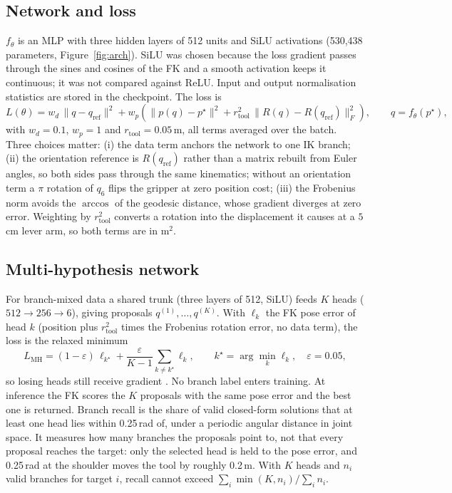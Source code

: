 \documentclass[11pt]{article}
\begin{document}
\subsection{Network and loss}
$f_\theta$ is an MLP with three hidden layers of 512 units and SiLU activations
\citep{elfwing2018silu} (530,438 parameters, Figure~\ref{fig:arch}). SiLU was
chosen because the loss gradient passes through the sines and cosines of the
FK and a smooth activation keeps it continuous; it was not compared against
ReLU. Input and output normalisation statistics are stored in the checkpoint.
The loss is
\begin{equation}
L(\theta) = w_d\,\|q-q_{\mathrm{ref}}\|^2
 + w_p\left(\|p(q)-p^\star\|^2 + r_{\mathrm{tool}}^2\,\|R(q)-R(q_{\mathrm{ref}})\|_F^2\right),
\qquad q=f_\theta(p^\star),
\label{eq:loss}
\end{equation}
with $w_d=0.1$, $w_p=1$ and $r_{\mathrm{tool}}=0.05$\,m, all terms averaged
over the batch. Three choices matter:
(i) the data term anchors the network to one IK branch;
(ii) the orientation reference is $R(q_{\mathrm{ref}})$ rather than a matrix
rebuilt from Euler angles, so both sides pass through the same kinematics;
without an orientation term a $\pi$ rotation of $q_6$ flips the gripper at zero
position cost;
(iii) the Frobenius norm avoids the $\arccos$ of the geodesic distance, whose
gradient diverges at zero error. Weighting by $r_{\mathrm{tool}}^2$ converts a
rotation into the displacement it causes at a $5$\,cm lever arm, so both terms
are in m$^2$.

\subsection{Multi-hypothesis network}
For branch-mixed data a shared trunk (three layers of 512, SiLU) feeds $K$
heads ($512\to256\to6$), giving proposals $q^{(1)},\dots,q^{(K)}$. With
$\ell_k$ the FK pose error of head $k$ (position plus $r_{\mathrm{tool}}^2$
times the Frobenius rotation error, no data term), the loss is the relaxed
minimum
\begin{equation}
L_{\mathrm{MH}} = (1-\varepsilon)\,\ell_{k^\star} + \frac{\varepsilon}{K-1}\sum_{k\neq k^\star}\ell_k,
\qquad k^\star=\arg\min_k \ell_k,\quad \varepsilon=0.05,
\end{equation}
so losing heads still receive gradient \citep{rupprecht2017uncertain}. No
branch label enters training. At inference the FK scores the $K$ proposals with
the same pose error and the best one is returned. Branch recall is the share
of valid closed-form solutions that at least one head lies within 0.25\,rad of,
under a periodic angular distance in joint space. It measures how many branches
the proposals point to, not that every proposal reaches the target: only the
selected head is held to the pose error, and 0.25\,rad at the shoulder moves
the tool by roughly 0.2\,m. With $K$ heads and $n_i$ valid branches for target
$i$, recall cannot exceed $\sum_i \min(K,n_i)/\sum_i n_i$.
\end{document}
